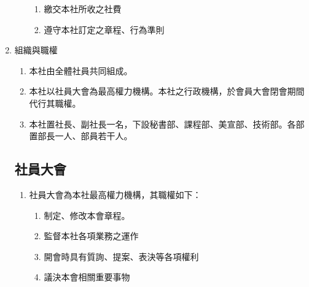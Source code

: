 \documentclass[10pt, a4paper]{cos}
\begin{document}
\begin{enumerate}
\begin{enumerate}
\begin{enumerate}
\item 繳交本社所收之社費
\item 遵守本社訂定之章程、行為準則
\end{enumerate}
\end{enumerate}
\item 組織與職權
\begin{enumerate}
\item 本社由全體社員共同組成。
\item 本社以社員大會為最高權力機構。本社之行政機構，於會員大會閉會期間代行其職權。
\item 本社置社長、副社長一名，下設秘書部、課程部、美宣部、技術部。各部置部長一人、部員若干人。
\end{enumerate}
\subsection{社員大會}
\begin{enumerate}
\item 社員大會為本社最高權力機構，其職權如下：
\begin{enumerate}
\item 制定、修改本會章程。 
\item 監督本社各項業務之運作
\item 開會時具有質詢、提案、表決等各項權利
\item 議決本會相關重要事物
\end{enumerate}
\end{enumerate}
\end{enumerate}
\end{document}

